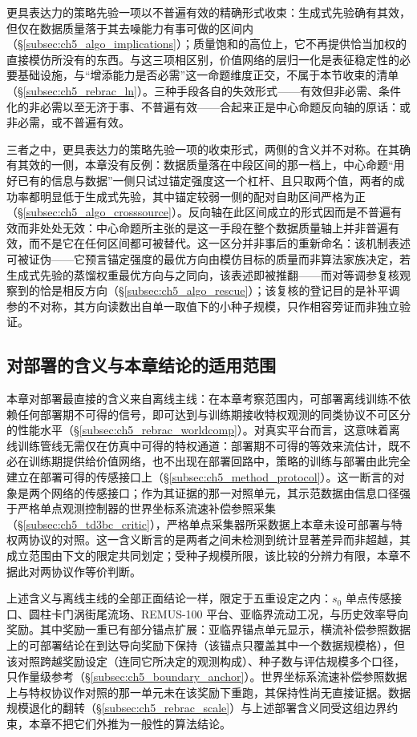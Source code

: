 更具表达力的策略先验一项以不普遍有效的精确形式收束：生成式先验确有其效，但仅在数据质量落于其去噪能力有事可做的区间内（\S\ref{subsec:ch5_algo_implications}）；质量饱和的高位上，它不再提供恰当加权的直接模仿所没有的东西。与这三项相区别，价值网络的层归一化是表征稳定性的必要基础设施，与“增添能力是否必需”这一命题维度正交，不属于本节收束的清单（\S\ref{subsec:ch5_rebrac_ln}）。三种手段各自的失效形式——有效但非必需、条件化的非必需以至无济于事、不普遍有效——合起来正是中心命题反向轴的原话：或非必需，或不普遍有效。

三者之中，更具表达力的策略先验一项的收束形式，两侧的含义并不对称。在其确有其效的一侧，本章没有反例：数据质量落在中段区间的那一档上，中心命题“用好已有的信息与数据”一侧只试过锚定强度这一个杠杆、且只取两个值，两者的成功率都明显低于生成式先验，其中锚定较弱一侧的配对自助区间严格为正（\S\ref{subsec:ch5_algo_crosssource}）。反向轴在此区间成立的形式因而是不普遍有效而非处处无效：中心命题所主张的是这一手段在整个数据质量轴上并非普遍有效，而不是它在任何区间都可被替代。这一区分并非事后的重新命名：该机制表述可被证伪——它预言锚定强度的最优方向由模仿目标的质量而非算法家族决定，若生成式先验的蒸馏权重最优方向与之同向，该表述即被推翻——而对等调参复核观察到的恰是相反方向（\S\ref{subsec:ch5_algo_rescue}）；该复核的登记目的是补平调参的不对称，其方向读数出自单一取值下的小种子规模，只作相容旁证而非独立验证。

\subsection{对部署的含义与本章结论的适用范围}\label{subsec:ch5_discussion_deployment}

本章对部署最直接的含义来自离线主线：在本章考察范围内，可部署离线训练不依赖任何部署期不可得的信号，即可达到与训练期接收特权观测的同类协议不可区分的性能水平（\S\ref{subsec:ch5_rebrac_worldcomp}）。对真实平台而言，这意味着离线训练管线无需仅在仿真中可得的特权通道：部署期不可得的等效来流估计，既不必在训练期提供给价值网络，也不出现在部署回路中，策略的训练与部署由此完全建立在部署可得的传感接口上（\S\ref{subsec:ch5_method_protocol}）。这一断言的对象是两个网络的传感接口；作为其证据的那一对照单元，其示范数据由信息口径强于严格单点观测控制器的世界坐标系流速补偿参照采集（\S\ref{subsec:ch5_td3bc_critic}），严格单点采集器所采数据上本章未设可部署与特权两协议的对照。这一含义断言的是两者之间未检测到统计显著差异而非超越，其成立范围由下文的限定共同划定；受种子规模所限，该比较的分辨力有限，本章不据此对两协议作等价判断。

上述含义与离线主线的全部正面结论一样，限定于五重设定之内：$s_0$ 单点传感接口、圆柱卡门涡街尾流场、REMUS-100 平台、亚临界流动工况，与历史效率导向奖励。其中奖励一重已有部分锚点扩展：亚临界锚点单元显示，横流补偿参照数据上的可部署结论在到达导向奖励下保持（该锚点只覆盖其中一个数据规模格），但该对照跨越奖励设定（连同它所决定的观测构成）、种子数与评估规模多个口径，只作量级参考（\S\ref{subsec:ch5_boundary_anchor}）。世界坐标系流速补偿参照数据上与特权协议作对照的那一单元未在该奖励下重跑，其保持性尚无直接证据。数据规模退化的翻转（\S\ref{subsec:ch5_rebrac_scale}）与上述部署含义同受这组边界约束，本章不把它们外推为一般性的算法结论。

